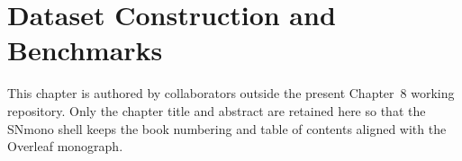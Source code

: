 \chapter{Dataset Construction and Benchmarks}
\label{ch:datasets}




This chapter is authored by collaborators outside the present Chapter~8 working repository. Only the chapter title and abstract are retained here so that the SNmono shell keeps the book numbering and table of contents aligned with the Overleaf monograph.
